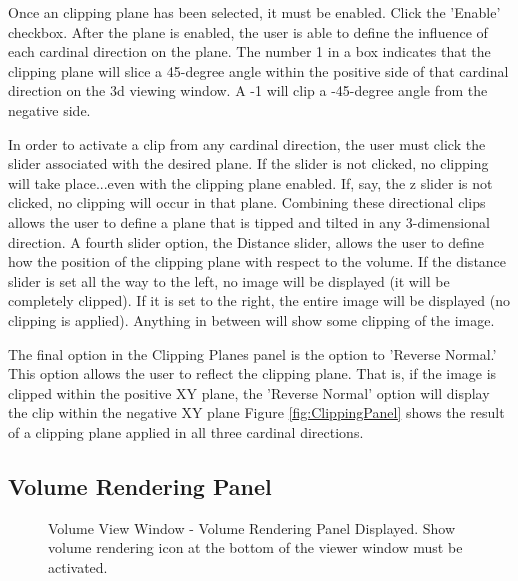 \documentclass[fleqn,11pt,openany]{book}
\begin{document}
Once an clipping plane has been selected, it must be enabled.  Click the 'Enable' checkbox.  
After the plane is enabled, the user is able to define the influence of each cardinal direction on the plane.  
The number 1 in a box indicates that the clipping plane will slice a 45-degree angle within the positive side of that cardinal direction on the 3d viewing window. 
A -1 will clip a -45-degree angle from the negative side.

In order to activate a clip from any cardinal direction, the user must click the slider associated with the desired plane.
If the slider is not clicked, no clipping will take place...even with the clipping plane enabled.
If, say, the z slider is not clicked, no clipping will occur in that plane.
Combining these directional clips allows the user to define a plane that is tipped and tilted in any 3-dimensional direction.
A fourth slider option, the Distance slider, allows the user to define how the position of the clipping plane with respect to the volume.  
If the distance slider is set all the way to the left, no image will be displayed (it will be completely clipped).
If it is set to the right, the entire image will be displayed (no clipping is applied).  
Anything in between will show some clipping of the image.

The final option in the Clipping Planes panel is the option to 'Reverse Normal.'
This option allows the user to reflect the clipping plane.
That is, if the image is clipped within the positive XY plane, the 'Reverse Normal' option will display the clip within the negative XY plane
Figure \ref{fig:ClippingPanel} shows the result of a clipping plane applied in all three cardinal directions.

\subsection{Volume Rendering Panel}

\begin{figure}[b!]
\caption{Volume View Window - Volume Rendering Panel Displayed. Show volume rendering icon at the bottom of the viewer window must be activated.}\label{fig:VolRendPanel}
\end{figure}
\end{document}

